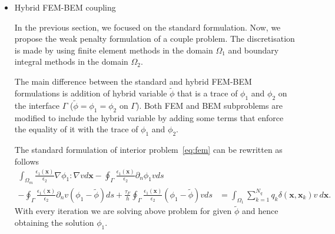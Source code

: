 \begin{itemize}


    \item Hybrid FEM-BEM coupling
    
  In the previous section, we focused on the standard formulation. Now, we propose the weak penalty formulation of a couple problem. The discretisation is made by using finite element methods in the domain $\Omega_1$ and boundary integral methods in the domain $\Omega_2$.
  
    The main difference between the standard and hybrid FEM-BEM formulations is addition of hybrid variable $\widetilde{\phi}$ that is a trace of $\phi_1$ and $\phi_2$ on the interface $\Gamma$ ($\widetilde{\phi} = \phi_1 = \phi_2$ on  $\Gamma$). Both FEM and BEM subproblems are modified to include the hybrid variable by adding some terms that enforce the equality of it with the trace of $\phi_1$ and $\phi_2$.
    
    The standard formulation of interior problem~\eqref{eq:fem} can be rewritten as follows
\begin{align*}
 \int_{\Omega_m} \frac{\epsilon_1(\mathbf{x})}{\epsilon_2} \nabla \phi_1 : \nabla v d\mathbf{x} -  \oint_\Gamma \frac{\epsilon_1(\mathbf{x})}{\epsilon_2}  \partial_n \phi_1 v ds
  & \\
 -  \oint_\Gamma \frac{\epsilon_1(\mathbf{x})}{\epsilon_2} \partial_n v (\phi_1 - \widetilde{\phi}) ds
  + \tfrac{\tau_F}{h} \oint_\Gamma \frac{\epsilon_1(\mathbf{x})}{\epsilon_2} (\phi_1 - \widetilde{\phi}) v ds & = \int_{\Omega_1}  \sum_{k=1}^{N_q} q_k\delta(\mathbf{x},\mathbf{x}_k)   v ~d\mathbf{x}.
\end{align*}
With every iteration we are solving above problem for given $\widetilde{\phi}$ and hence obtaining the solution $ \phi_1$.


\end{itemize}

